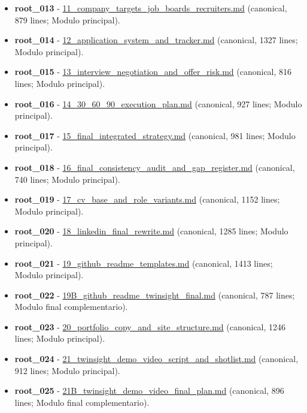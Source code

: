 \begin{itemize}
\item \textbf{root\_013} - \href{file:///E:/Laboral/11_company_targets_job_boards_recruiters.md}{11\_company\_targets\_job\_boards\_recruiters.md} (canonical, 879 lines; Modulo principal).
\item \textbf{root\_014} - \href{file:///E:/Laboral/12_application_system_and_tracker.md}{12\_application\_system\_and\_tracker.md} (canonical, 1327 lines; Modulo principal).
\item \textbf{root\_015} - \href{file:///E:/Laboral/13_interview_negotiation_and_offer_risk.md}{13\_interview\_negotiation\_and\_offer\_risk.md} (canonical, 816 lines; Modulo principal).
\item \textbf{root\_016} - \href{file:///E:/Laboral/14_30_60_90_execution_plan.md}{14\_30\_60\_90\_execution\_plan.md} (canonical, 927 lines; Modulo principal).
\item \textbf{root\_017} - \href{file:///E:/Laboral/15_final_integrated_strategy.md}{15\_final\_integrated\_strategy.md} (canonical, 981 lines; Modulo principal).
\item \textbf{root\_018} - \href{file:///E:/Laboral/16_final_consistency_audit_and_gap_register.md}{16\_final\_consistency\_audit\_and\_gap\_register.md} (canonical, 740 lines; Modulo principal).
\item \textbf{root\_019} - \href{file:///E:/Laboral/17_cv_base_and_role_variants.md}{17\_cv\_base\_and\_role\_variants.md} (canonical, 1152 lines; Modulo principal).
\item \textbf{root\_020} - \href{file:///E:/Laboral/18_linkedin_final_rewrite.md}{18\_linkedin\_final\_rewrite.md} (canonical, 1285 lines; Modulo principal).
\item \textbf{root\_021} - \href{file:///E:/Laboral/19_github_readme_templates.md}{19\_github\_readme\_templates.md} (canonical, 1413 lines; Modulo principal).
\item \textbf{root\_022} - \href{file:///E:/Laboral/19B_github_readme_twinsight_final.md}{19B\_github\_readme\_twinsight\_final.md} (canonical, 787 lines; Modulo final complementario).
\item \textbf{root\_023} - \href{file:///E:/Laboral/20_portfolio_copy_and_site_structure.md}{20\_portfolio\_copy\_and\_site\_structure.md} (canonical, 1246 lines; Modulo principal).
\item \textbf{root\_024} - \href{file:///E:/Laboral/21_twinsight_demo_video_script_and_shotlist.md}{21\_twinsight\_demo\_video\_script\_and\_shotlist.md} (canonical, 912 lines; Modulo principal).
\item \textbf{root\_025} - \href{file:///E:/Laboral/21B_twinsight_demo_video_final_plan.md}{21B\_twinsight\_demo\_video\_final\_plan.md} (canonical, 896 lines; Modulo final complementario).

\end{itemize}
